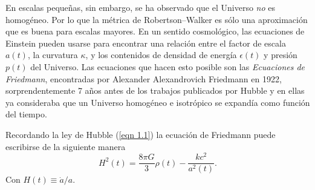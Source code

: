 \documentclass[a4paper,openright,12pt]{book}
\begin{document}
En escalas pequeñas, sin embargo, se ha observado que el Universo \textit{no} es homogéneo. Por lo que la métrica de Robertson--Walker es sólo una aproximación que es buena para escalas mayores. En un sentido cosmológico, las ecuaciones de Einstein pueden usarse para encontrar una relación entre el factor de escala $a(t)$, la curvatura $\kappa$, y los contenidos de densidad de energía $\epsilon(t)$ y presión $p(t)$ del Universo. Las ecuaciones que hacen esto posible son las \textit{Ecuaciones de Friedmann}, encontradas por Alexander Alexandrovich Friedmann en 1922, sorprendentemente 7 años antes de los trabajos publicados por Hubble y en ellas ya consideraba que un Universo homogéneo e isotrópico se expandía como función del tiempo. 

Recordando la ley de Hubble (\ref{eqn 1.1}) la ecuación de Friedmann puede escribirse de la siguiente manera
\begin{equation}
H^{2}(t) = \frac{8 \pi G}{3}\rho(t) 
-\frac{k c^{2}}{a^{2}(t)}.\label{eqn 1.19}
\end{equation}
Con $H(t) \equiv \dot{a}/a$.
\end{document}
